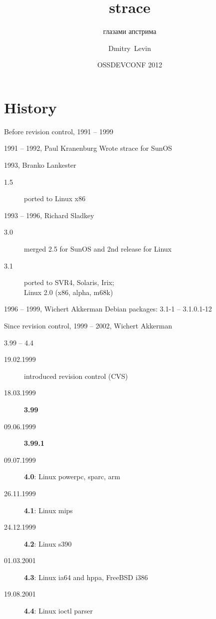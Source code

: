 \documentclass[unicode]{beamer}
\title{\Huge strace}
\subtitle{\Huge глазами апстрима}
\author{\Huge Dmitry~Levin}
\date{\Huge OSSDEVCONF 2012}
\begin{document}
\begin{frame}
	\titlepage
\end{frame}

\section{History}

\begin{frame}{Before revision control, 1991 -- 1999}
	\begin{block}{1991 -- 1992, Paul Kranenburg}
	Wrote strace for SunOS
	\end{block}
	\begin{block}{1993, Branko Lankester}
	\begin{description}
		\item[1.5] ported to Linux x86
	\end{description}
	\end{block}
	\begin{block}{1993 -- 1996, Richard Sladkey}
	\begin{description}
		\item[3.0] merged 2.5 for SunOS and 2nd release for Linux
		\item[3.1] ported to SVR4, Solaris, Irix; \\ Linux 2.0 (x86, alpha, m68k)
	\end{description}
	\end{block}
	\begin{block}{1996 -- 1999, Wichert Akkerman}
		Debian packages: 3.1-1 -- 3.1.0.1-12
	\end{block}
\end{frame}

\begin{frame}{Since revision control, 1999 -- 2002, Wichert Akkerman}
	\begin{block}{3.99 -- 4.4}
	\begin{description}
		\item[19.02.1999] introduced revision control (CVS)
		\item[18.03.1999] {\bf 3.99}
		\item[09.06.1999] {\bf 3.99.1}
		\item[09.07.1999] {\bf 4.0}: Linux powerpc, sparc, arm
		\item[26.11.1999] {\bf 4.1}: Linux mips
		\item[24.12.1999] {\bf 4.2}: Linux s390
		\item[01.03.2001] {\bf 4.3}: Linux ia64 and hppa, FreeBSD i386
		\item[19.08.2001] {\bf 4.4}: Linux ioctl parser
	\end{description}
	\end{block}
\end{frame}
\end{document}
